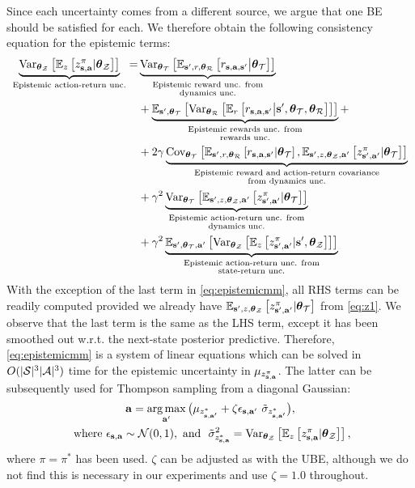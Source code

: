 \documentclass{article}
\begin{document}
\begin{appendices}
Since each uncertainty comes from a different source, we argue that one BE should be satisfied for each. We therefore obtain the following consistency equation for the epistemic terms:
\begin{align}\label{eq:epistemicmm}
\underbrace{\Var_{\thetamcz} \sqb{\E_z\sqb{\zb | \thetamcz}}}_{\text{Epistemic action-return unc.}} =& \underbrace{\Var_{\thetamct} \sqb{ \E_{\ns, r, \thetamcr} \sqb{\rsanb \big| \thetamct}}}_{\substack{\text{Epistemic reward unc. from}  \\ \text{dynamics unc.}}} \\
& + \underbrace{\E_{\ns, \thetamct}\sqb{ \Var_{\thetamcr} \sqb{ \E_r \sqb{\rsanb \big| \ns, \thetamct, \thetamcr}}}}_{\substack{\text{Epistemic rewards unc. from} \\ \text{rewards unc.}}} + \nonumber \\
& + 2 \gamma \underbrace{\Cov_{\thetamct}\sqb{\E_{\ns, r, \thetamcr}\sqb{\rsanb | \thetamct}, \E_{\ns, z, \thetamcz, \ac'}\sqb{\znb | \thetamct}}}_{\substack{\text{Epistemic reward and action-return covariance} \\ \text{from dynamics unc.}}} \nonumber \\
& + \gamma^2 \underbrace{\Var_{\thetamct} \sqb{\E_{\ns, z, \thetamcz, \ac'} \sqb{\znb | \thetamct}}}_{\substack{\text{Epistemic action-return unc. from} \\ \text{dynamics unc.}}} \nonumber \\
& +  \gamma^2 \underbrace{\E_{\ns, \thetamct, \ac'}\sqb{\Var_{\thetamcz} \sqb{ \E_z \sqb{\znb | \ns, \thetamcz}}}}_{\substack{\text{Epistemic action-return unc. from} \\ \text{state-return unc.}}} \nonumber
\end{align}
With the exception of the last term in \cref{eq:epistemicmm}, all RHS terms can be readily computed provided we already have $\E_{\ns, z, \thetamcz}\sqb{\znb | \thetamct}$ from \cref{eq:z1}. We observe that the last term is the same as the LHS term, except it has been smoothed out w.r.t. the next-state posterior predictive. Therefore, \cref{eq:epistemicmm} is a system of linear equations which can be solved in $O(|\mcs|^3|\mca|^3)$ time for the epistemic uncertainty in $\mu_{\zb}$. The latter can be subsequently used for Thompson sampling from a diagonal Gaussian:
\begin{gather*}
\ac = \argmax_{\ac'} \big(\mu_{z^{{*}}_{\s, \ac'}} + \zeta \epsilon_{\s, \ac'}~\tilde{\sigma}_{z^*_{\s, \ac'}} \big),\\
\text{ where } \epsilon_{\s, \ac} \sim \mc{N}(0, 1), \text{ and }~\tilde{\sigma}^2_{z^*_{\s, \ac}} = \Var_{\thetamcz} \sqb{\E_z\sqb{\zb | \thetamcz}},
\end{gather*}
where $\pi = \pi^*$ has been used. $\zeta$ can be adjusted as with the UBE, although we do not find this is necessary in our experiments and use $\zeta = 1.0$ throughout.


\end{appendices}
\end{document}
